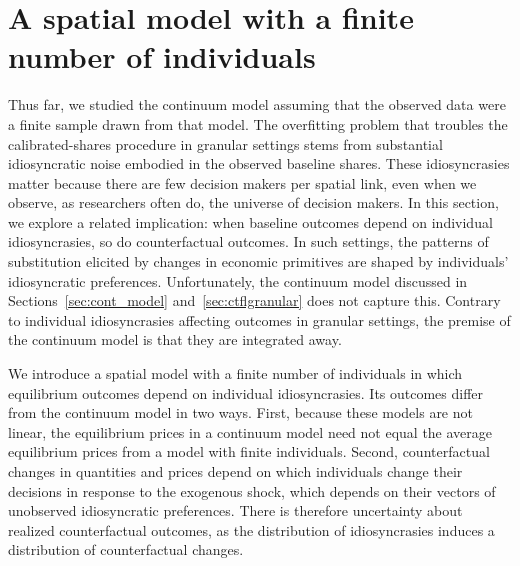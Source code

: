 \documentclass[11pt]{article}
\theoremstyle{definition}
\begin{document}
\section{A spatial model with a finite number of individuals}\label{sec:finitemodel}

Thus far, we studied the continuum model assuming that the observed data were a finite sample drawn from that model.
The overfitting problem that troubles the calibrated-shares procedure in granular settings stems from substantial idiosyncratic noise embodied in the observed baseline shares.
These idiosyncrasies matter because there are few decision makers per spatial link, even when we observe, as researchers often do, the universe of decision makers.
In this section, we explore a related implication: when baseline outcomes depend on individual idiosyncrasies, so do counterfactual outcomes.
In such settings, the patterns of substitution elicited by changes in economic primitives are shaped by individuals' idiosyncratic preferences.
Unfortunately, the continuum model discussed in Sections~\ref{sec:cont_model} and~\ref{sec:ctflgranular}
does not capture this.
Contrary to individual idiosyncrasies affecting outcomes in granular settings,
the premise of the continuum model is that they are integrated away.

We introduce a spatial model with a finite number of individuals
in which equilibrium outcomes depend on individual idiosyncrasies.
Its outcomes differ from the continuum model in two ways.
First, 
because these models are not linear,
the equilibrium prices in a continuum model
need not equal
the average equilibrium prices from a model with finite individuals.
Second,
counterfactual changes in quantities and prices 
depend on which individuals change their decisions in response to the exogenous shock,
which depends on their vectors of unobserved idiosyncratic preferences. 
There is therefore uncertainty about realized counterfactual outcomes,
as the distribution of idiosyncrasies induces a distribution of counterfactual changes.
\end{document}
